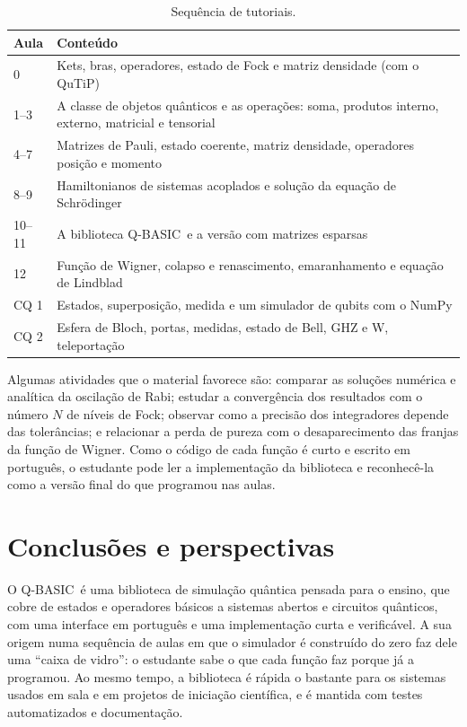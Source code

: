 \documentclass[11pt,a4paper]{article}
\newcommand{\qbasic}{\textsc{Q-BASIC}}
\begin{document}
\begin{table}[htb]
  \centering
  \caption{Sequência de tutoriais.}
  \label{tab:aulas}
  \small
  \begin{tabular}{lp{11.5cm}}
    \toprule
    Aula & Conteúdo \\
    \midrule
    0 & Kets, bras, operadores, estado de Fock e matriz densidade (com o QuTiP) \\
    1--3 & A classe de objetos quânticos e as operações: soma, produtos interno, externo,
           matricial e tensorial \\
    4--7 & Matrizes de Pauli, estado coerente, matriz densidade, operadores posição e momento \\
    8--9 & Hamiltonianos de sistemas acoplados e solução da equação de Schrödinger \\
    10--11 & A biblioteca \qbasic\ e a versão com matrizes esparsas \\
    12 & Função de Wigner, colapso e renascimento, emaranhamento e equação de Lindblad \\
    \midrule
    CQ 1 & Estados, superposição, medida e um simulador de qubits com o NumPy \\
    CQ 2 & Esfera de Bloch, portas, medidas, estado de Bell, GHZ e W, teleportação \\
    \bottomrule
  \end{tabular}
\end{table}

Algumas atividades que o material favorece são: comparar as soluções numérica e analítica
da oscilação de Rabi; estudar a convergência dos resultados com o número $N$ de níveis de
Fock; observar como a precisão dos integradores depende das tolerâncias; e relacionar a
perda de pureza com o desaparecimento das franjas da função de Wigner. Como o código de
cada função é curto e escrito em português, o estudante pode ler a implementação da
biblioteca e reconhecê-la como a versão final do que programou nas aulas.

\section{Conclusões e perspectivas}\label{sec:conclusao}

O \qbasic\ é uma biblioteca de simulação quântica pensada para o ensino, que cobre de
estados e operadores básicos a sistemas abertos e circuitos quânticos, com uma interface em
português e uma implementação curta e verificável. A sua origem numa sequência de aulas em
que o simulador é construído do zero faz dele uma ``caixa de vidro'': o estudante sabe o
que cada função faz porque já a programou. Ao mesmo tempo, a biblioteca é rápida o
bastante para os sistemas usados em sala e em projetos de iniciação científica, e é
mantida com testes automatizados e documentação.
\end{document}
